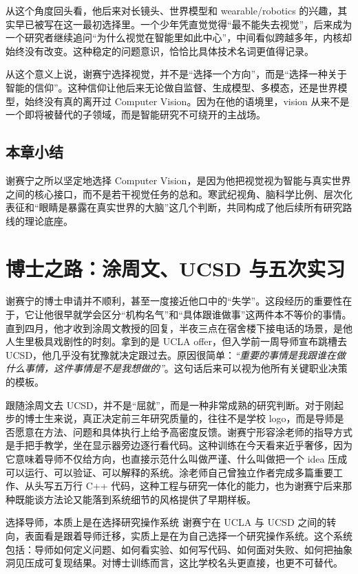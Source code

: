 \documentclass[a4paper,12pt]{article}
\begin{document}
从这个角度回头看，他后来对长镜头、世界模型和 wearable/robotics 的兴趣，其实早已被写在这一最初选择里。一个少年凭直觉觉得“最不能失去视觉”，后来成为一个研究者继续追问“为什么视觉在智能里如此中心”，中间看似跨越多年，内核却始终没有改变。这种稳定的问题意识，恰恰比具体技术名词更值得记录。

从这个意义上说，谢赛宁选择视觉，并不是“选择一个方向”，而是“选择一种关于智能的信仰”。这种信仰让他后来无论做自监督、生成模型、多模态，还是世界模型，始终没有真的离开过 Computer Vision。因为在他的语境里，vision 从来不是一个即将被替代的子领域，而是智能研究不可绕开的主战场。

\subsection{本章小结}

谢赛宁之所以坚定地选择 Computer Vision，是因为他把视觉视为智能与真实世界之间的核心接口，而不是若干视觉任务的总和。寒武纪视角、脑科学比例、层次化表征和“眼睛是暴露在真实世界的大脑”这几个判断，共同构成了他后续所有研究路线的理论底座。

\section{博士之路：涂周文、UCSD 与五次实习}

谢赛宁的博士申请并不顺利，甚至一度接近他口中的“失学”。这段经历的重要性在于，它让他很早就学会区分“机构名气”和“具体跟谁做事”这两件本不等价的事情。直到四月，他才收到涂周文教授的回复，半夜三点在宿舍楼下接电话的场景，是他人生里极具戏剧性的时刻。拿到的是 UCLA offer，但入学前一周导师宣布跳槽去 UCSD，他几乎没有犹豫就决定跟过去。原因很简单：\textit{``重要的事情是我跟谁在做什么事情，这件事情是不是我想做的''}。这句话后来可以视为他所有关键职业决策的模板。

跟随涂周文去 UCSD，并不是“屈就”，而是一种非常成熟的研究判断。对于刚起步的博士生来说，真正决定前三年研究质量的，往往不是学校 logo，而是导师是否愿意在方法、问题和具体执行上给予高密度反馈。谢赛宁形容涂老师的指导方式是手把手教学，坐在显示器旁边逐行看代码。这种训练在今天看来近乎奢侈，因为它意味着导师不仅给方向，也直接示范什么叫做严谨、什么叫做把一个 idea 压成可以运行、可以验证、可以解释的系统。涂老师自己曾独立作者完成多篇重要工作、从头写五万行 C++ 代码，这种工程与研究一体化的能力，也为谢赛宁后来那种既能谈方法论又能落到系统细节的风格提供了早期样板。

\begin{importantbox}{选择导师，本质上是在选择研究操作系统}
谢赛宁在 UCLA 与 UCSD 之间的转向，表面看是跟着导师迁移，实质上是在为自己选择一个研究操作系统。这个系统包括：导师如何定义问题、如何看实验、如何写代码、如何面对失败、如何把抽象洞见压成可复现结果。对博士训练而言，这比学校名头更直接，也更不可替代。
\end{importantbox}
\end{document}
